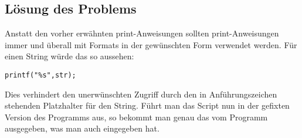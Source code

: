 \subsection{Lösung des Problems}
Anstatt den vorher erwähnten print-Anweisungen sollten print-Anweisungen immer und überall mit Formats in der gewünschten
Form verwendet werden. Für einen String würde das so aussehen:
\begin{lstlisting}
printf("%s",str);
\end{lstlisting}
Dies verhindert den unerwünschten Zugriff durch den in Anführungszeichen stehenden Platzhalter für den String.
Führt man das Script nun in der gefixten Version des Programms aus, so bekommt man genau das vom Programm ausgegeben,
was man auch eingegeben hat.
